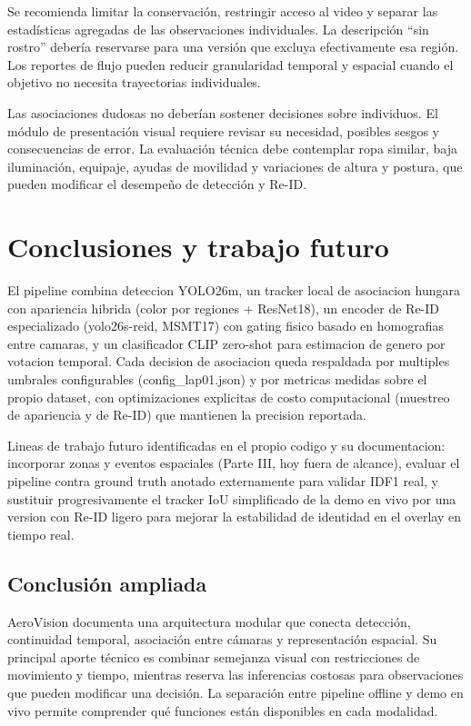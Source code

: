 \documentclass[12pt,letterpaper]{article}
\begin{document}
Se recomienda limitar la conservación, restringir acceso al video y separar las estadísticas agregadas de las observaciones individuales. La descripción ``sin rostro'' debería reservarse para una versión que excluya efectivamente esa región. Los reportes de flujo pueden reducir granularidad temporal y espacial cuando el objetivo no necesita trayectorias individuales.

Las asociaciones dudosas no deberían sostener decisiones sobre individuos. El módulo de presentación visual requiere revisar su necesidad, posibles sesgos y consecuencias de error. La evaluación técnica debe contemplar ropa similar, baja iluminación, equipaje, ayudas de movilidad y variaciones de altura y postura, que pueden modificar el desempeño de detección y Re-ID.

\section{Conclusiones y trabajo futuro}

El pipeline combina deteccion YOLO26m, un tracker local de asociacion hungara con apariencia hibrida (color por regiones + ResNet18), un encoder de Re-ID especializado (yolo26s-reid, MSMT17) con gating fisico basado en homografias entre camaras, y un clasificador CLIP zero-shot para estimacion de genero por votacion temporal. Cada decision de asociacion queda respaldada por multiples umbrales configurables (config\_\allowbreak lap01.json) y por metricas medidas sobre el propio dataset, con optimizaciones explicitas de costo computacional (muestreo de apariencia y de Re-ID) que mantienen la precision reportada.


Lineas de trabajo futuro identificadas en el propio codigo y su documentacion: incorporar zonas y eventos espaciales (Parte III, hoy fuera de alcance), evaluar el pipeline contra ground truth anotado externamente para validar IDF1 real, y sustituir progresivamente el tracker IoU simplificado de la demo en vivo por una version con Re-ID ligero para mejorar la estabilidad de identidad en el overlay en tiempo real.


\subsection{Conclusión ampliada}
AeroVision documenta una arquitectura modular que conecta detección, continuidad temporal, asociación entre cámaras y representación espacial. Su principal aporte técnico es combinar semejanza visual con restricciones de movimiento y tiempo, mientras reserva las inferencias costosas para observaciones que pueden modificar una decisión. La separación entre pipeline offline y demo en vivo permite comprender qué funciones están disponibles en cada modalidad.
\end{document}
